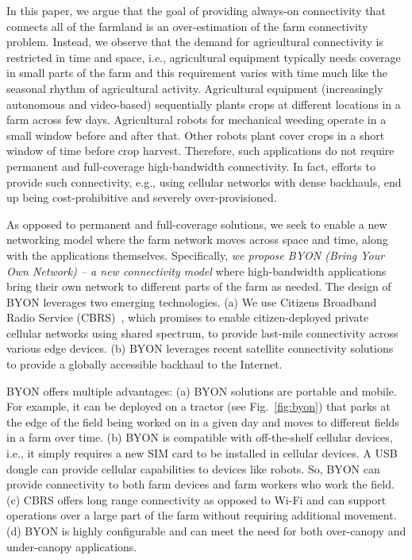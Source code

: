 In this paper, we argue that the goal of providing always-on connectivity that connects all of the farmland is an over-estimation of the farm connectivity problem. Instead, we observe that the demand for agricultural connectivity is restricted in time and space, i.e., agricultural equipment typically needs coverage in small parts of the farm and this requirement varies with time much like the seasonal rhythm of agricultural activity. Agricultural equipment (increasingly autonomous and video-based) sequentially plants crops at different locations in a farm across few days. Agricultural robots for mechanical weeding operate in a small window before and after that. Other robots plant cover crops in a short window of time before crop harvest. Therefore, such applications do not require permanent and full-coverage high-bandwidth connectivity. In fact, efforts to provide such connectivity, e.g., using cellular networks with dense backhauls, end up being cost-prohibitive and severely over-provisioned.



As opposed to permanent and full-coverage solutions, we seek to enable a new networking model where the farm network moves across space and time, along with the applications themselves. Specifically, \textit{we propose BYON (Bring Your Own Network) -- a new connectivity model} where high-bandwidth applications bring their own network to different parts of the farm as needed. %
The design of BYON leverages two emerging technologies. (a) We use Citizens Broadband Radio Service (CBRS)~\cite{cbrs}, which promises to enable citizen-deployed private cellular networks using shared spectrum, to provide last-mile connectivity across various edge devices. (b) BYON leverages recent satellite connectivity solutions \cite{starlink} to provide a globally accessible backhaul to the Internet. 

BYON offers multiple advantages: (a) BYON solutions are  portable and mobile. For example, it can be deployed on a tractor (see Fig.~\ref{fig:byon}) that parks at the edge of the field being worked on in a given day and moves to different fields in a farm over time. (b) BYON is compatible with off-the-shelf cellular devices, i.e., it simply requires a new SIM card to be installed in cellular devices. A USB dongle can provide cellular capabilities to devices like robots. So, BYON can provide connectivity to both farm devices and farm workers who work the field. (c) CBRS offers long range connectivity as opposed to Wi-Fi and can support operations over a large part of the farm without requiring additional movement. (d) BYON is highly configurable and can meet the need for both over-canopy and under-canopy applications.

